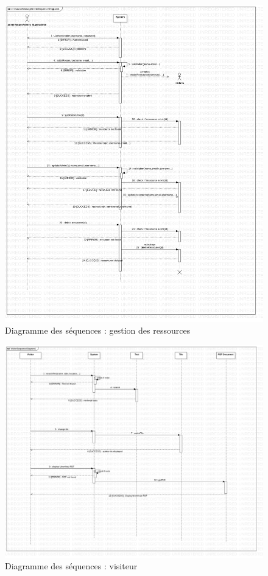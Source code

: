     \begin{figure}[t]
        \centering
        \includegraphics[width=1\textwidth]{images/Analyse_des_besoins/ressourceManagementSequenceDiagram1.png}
        \caption{Diagramme des séquences : gestion des ressources}
        \label{fig:ressourceManagementSequenceDiagram1}
    \end{figure}

    \begin{figure}[t]
        \centering
        \includegraphics[width=1\textwidth]{images/Analyse_des_besoins/VisitorSequenceDiagram1.png}
        \caption{Diagramme des séquences : visiteur}
        \label{fig:VisitorSequenceDiagram1}
    \end{figure}